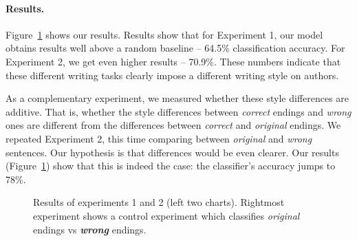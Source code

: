 \documentclass[11pt,a4paper]{article}
\newcommand{\figref}[1]{Figure~\ref{#1}}
\begin{document}
\paragraph{Results.}
\figref{results} shows our results.
Results show that for Experiment 1, our model obtains results well above a random baseline -- 64.5\% classification accuracy. 
For Experiment 2, we get even higher results -- 70.9\%. 
These numbers indicate that these different writing tasks clearly impose a different writing style on authors. 

As a complementary experiment, we measured whether these style differences are additive. 
That is, whether the style differences between {\it correct} endings and {\it wrong} ones are different from the differences between {\it correct} and {\it original} endings.
We repeated Experiment 2, this time comparing between {\it original} and {\it wrong} sentences. 
Our hypothesis is that differences would be even clearer. 
Our results (\figref{results}) show that this is indeed the case: the classifier's accuracy jumps to 78\%.

\begin{figure}
\caption{\label{results} Results of  experiments 1 and 2 (left two charts). 
Rightmost experiment shows a control experiment which classifies {\it original} endings vs \textit{\textbf{wrong}} endings. }
\end{figure}
\end{document}
